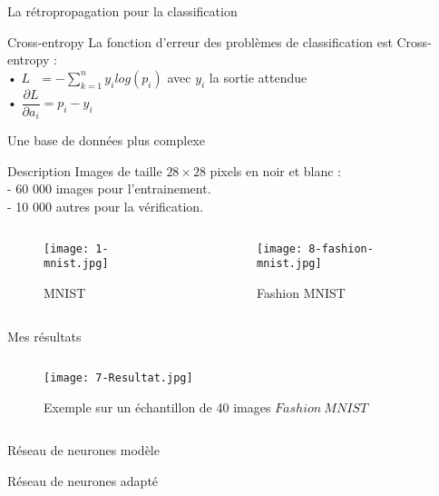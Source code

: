\begin{frame}{La rétropropagation pour la classification}
	\begin{block}{Cross-entropy}
		La fonction d'erreur des problèmes de classification est Cross-entropy : \\
		• $L\ \ \ = -\sum_{k=1}^{n}y_ilog(p_i)$ avec $y_i$ la sortie attendue \\
		• $\dfrac{\partial L}{\partial a_i} = p_i - y_i$
	\end{block}
\end{frame}



\begin{frame}{Une base de données plus complexe}
    \begin{block}{Description}
        Images de taille $28 \times 28$ pixels en noir et blanc : \\
        \quad - 60 000 images pour l'entrainement. \\
        \quad - 10 000 autres pour la vérification.
    \end{block}
    \begin{columns}
        \begin{column}{0.5\textwidth}
            \begin{figure}
                \centering
                \texttt{[image: 1-mnist.jpg]}
                \caption{MNIST}
            \end{figure}
        \end{column}
        \begin{column}{0.5\textwidth}
            \begin{figure}
                \centering
                \texttt{[image: 8-fashion-mnist.jpg]}
                \caption{Fashion MNIST}
            \end{figure}
        \end{column}
    \end{columns}
\end{frame}


\begin{frame}{Mes résultats}
    \begin{columns}[T]
        \begin{column}{.75\textwidth}
            \begin{figure}
                \centering
                \texttt{[image: 7-Resultat.jpg]}
                \caption{Exemple sur un échantillon de 40 images $Fashion\ MNIST$}
            \end{figure}
        \end{column}
        \hfill
        \begin{column}{.25\textwidth}
            \bigskip	\bigskip	\bigskip
            
        \end{column}
    \end{columns}
\end{frame}



\begin{frame}[fragile]{Réseau de neurones modèle}
    
\end{frame}

\begin{frame}[fragile]{Réseau de neurones adapté}
    
\end{frame}